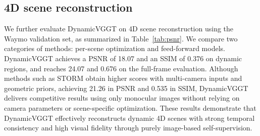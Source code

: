 \subsection{4D scene reconstruction}

We further evaluate DynamicVGGT on 4D scene reconstruction using the Waymo validation set, as summarized in Table~\ref{tab:psnr}.
We compare two categories of methods: per-scene optimization and feed-forward models.
DynamicVGGT achieves a PSNR of 18.07 and an SSIM of 0.376 on dynamic regions, and reaches 24.07 and 0.676 on the full-frame evaluation.
Although methods such as STORM obtain higher scores with multi-camera inputs and geometric priors, achieving 21.26 in PSNR and 0.535 in SSIM, DynamicVGGT delivers competitive results using only monocular images without relying on camera parameters or scene-specific optimization.
These results demonstrate that DynamicVGGT effectively reconstructs dynamic 4D scenes with strong temporal consistency and high visual fidelity through purely image-based self-supervision.




